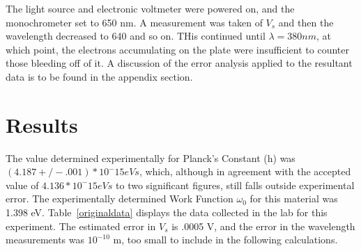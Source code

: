 \documentclass[aps,pre,twocolumn,nofootinbib]{revtex4}
\begin{document}
The light source and electronic voltmeter were powered on, and the monochrometer set to 650 nm.  A measurement was taken of $V_s$ and then the wavelength decreased to 640 and so on.  THis continued until $\lambda = 380 nm$, at which point, the electrons accumulating on the plate were insufficient to counter those bleeding off of it.  A discussion of the error analysis applied to the resultant data is to be found in the appendix section.  

\section{Results}

The value determined experimentally for Planck's Constant (h) was $(4.187 +/- .001)*10^-15 eV s$, which, although in agreement with the accepted value of $4.136*10^-15 eV s$ to two significant figures, still falls outside experimental error.  The experimentally determined Work Function $\omega_0$ for this material was 1.398 eV.   Table~\ref{originaldata} displays the data collected in the lab for this experiment.  The estimated error in $V_s$ is .0005 V, and the error in the wavelength measurements was $10^{-10}$ m, too small to include in the following calculations.  
\end{document}
